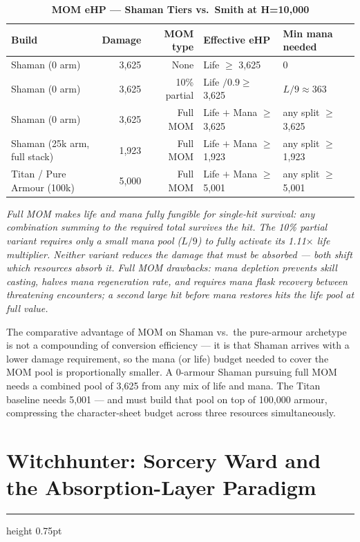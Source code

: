 \documentclass[12pt, letterpaper]{article}
\newcommand{\newsection}[1]{%
    \newpage
    \section{#1}
    \hrule height 0.75pt
    \vspace{4pt}
}
\begin{document}
\begin{table}[htbp]
\centering
\caption{\textbf{MOM eHP --- Shaman Tiers vs.\ Smith at H=10{,}000}}
\begin{tabular}{lrrll}
\toprule
\textbf{Build} & \textbf{Damage} & \textbf{MOM type} & \textbf{Effective eHP} & \textbf{Min mana needed} \\
\midrule
\rowcolor{rowalt} Shaman (0 arm) & 3{,}625 & None & Life $\geq$ 3{,}625 & 0 \\
Shaman (0 arm) & 3{,}625 & 10\% partial & Life $/ 0.9 \geq$ 3{,}625 & $L / 9 \approx 363$ \\
\rowcolor{rowalt} Shaman (0 arm) & 3{,}625 & Full MOM & Life $+$ Mana $\geq$ 3{,}625 & any split $\geq$ 3{,}625 \\
Shaman (25k arm, full stack) & 1{,}923 & Full MOM & Life $+$ Mana $\geq$ 1{,}923 & any split $\geq$ 1{,}923 \\
\rowcolor{rowhi} Titan / Pure Armour (100k) & 5{,}000 & Full MOM & Life $+$ Mana $\geq$ 5{,}001 & any split $\geq$ 5{,}001 \\
\bottomrule
\end{tabular}
\smallskip
\begin{minipage}{\linewidth}
\small\textit{Full MOM makes life and mana fully fungible for single-hit survival: any combination summing to the required total survives the hit. The 10\% partial variant requires only a small mana pool ($L/9$) to fully activate its 1.11$\times$ life multiplier. Neither variant reduces the damage that must be absorbed --- both shift which resources absorb it. Full MOM drawbacks: mana depletion prevents skill casting, halves mana regeneration rate, and requires mana flask recovery between threatening encounters; a second large hit before mana restores hits the life pool at full value.}
\end{minipage}
\end{table}

The comparative advantage of MOM on Shaman vs.\ the pure-armour archetype is not a compounding of conversion efficiency --- it is that Shaman arrives with a lower damage requirement, so the mana (or life) budget needed to cover the MOM pool is proportionally smaller. A 0-armour Shaman pursuing full MOM needs a combined pool of 3{,}625 from any mix of life and mana. The Titan baseline needs 5{,}001 --- and must build that pool on top of 100{,}000 armour, compressing the character-sheet budget across three resources simultaneously.

\newsection{Witchhunter: Sorcery Ward and the Absorption-Layer Paradigm}
\end{document}
